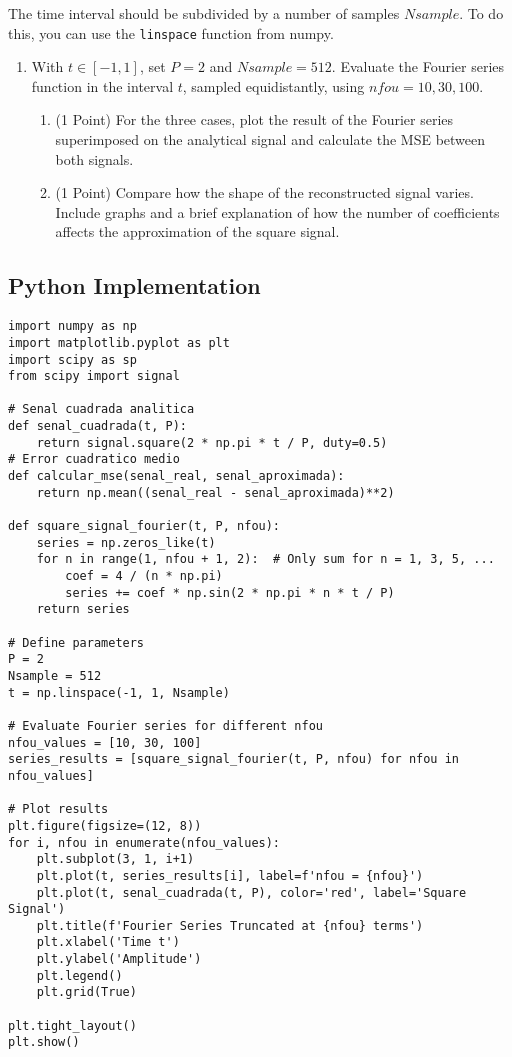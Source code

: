 \documentclass[10pt]{article}
\theoremstyle{definition}
\theoremstyle{remark}
\theoremstyle{definition}
\numberwithin{equation}{prob}
\begin{document}
The time interval should be subdivided by a number of samples \(Nsample\). To do this, you can use the \texttt{linspace} function from numpy.

\begin{enumerate}
    \item With \( t \in [-1, 1] \), set \( P = 2 \) and \( Nsample=512 \). Evaluate the Fourier series function in the interval \( t \), sampled equidistantly, using \( nfou = 10, 30, 100 \).
    \begin{enumerate}
        \item (1 Point) For the three cases, plot the result of the Fourier series superimposed on the analytical signal and calculate the MSE between both signals.
        \item (1 Point) Compare how the shape of the reconstructed signal varies. Include graphs and a brief explanation of how the number of coefficients affects the approximation of the square signal.
    \end{enumerate}
\end{enumerate}

\subsection*{Python Implementation}

\begin{lstlisting}
import numpy as np
import matplotlib.pyplot as plt
import scipy as sp
from scipy import signal

# Senal cuadrada analitica
def senal_cuadrada(t, P):
    return signal.square(2 * np.pi * t / P, duty=0.5)
# Error cuadratico medio
def calcular_mse(senal_real, senal_aproximada):
    return np.mean((senal_real - senal_aproximada)**2)

def square_signal_fourier(t, P, nfou):
    series = np.zeros_like(t)
    for n in range(1, nfou + 1, 2):  # Only sum for n = 1, 3, 5, ...
        coef = 4 / (n * np.pi)
        series += coef * np.sin(2 * np.pi * n * t / P)
    return series

# Define parameters
P = 2
Nsample = 512
t = np.linspace(-1, 1, Nsample)

# Evaluate Fourier series for different nfou
nfou_values = [10, 30, 100]
series_results = [square_signal_fourier(t, P, nfou) for nfou in nfou_values]

# Plot results
plt.figure(figsize=(12, 8))
for i, nfou in enumerate(nfou_values):
    plt.subplot(3, 1, i+1)
    plt.plot(t, series_results[i], label=f'nfou = {nfou}')
    plt.plot(t, senal_cuadrada(t, P), color='red', label='Square Signal')
    plt.title(f'Fourier Series Truncated at {nfou} terms')
    plt.xlabel('Time t')
    plt.ylabel('Amplitude')
    plt.legend()
    plt.grid(True)

plt.tight_layout()
plt.show()
\end{lstlisting}
\end{document}
